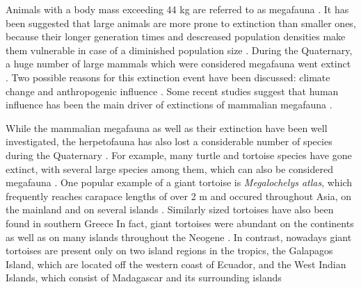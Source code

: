 Animals with a body mass exceeding 44 kg are referred to as megafauna \citep{Barnosky2004, Rhodin2015, Sandom2014}.
It has been suggested that large animals are more prone to extinction than smaller ones, because their longer generation times and descreased population densities make them vulnerable in case of a diminished population size \citep{.}. 
During the Quaternary, a huge number of large mammals which were considered megafauna went extinct \citep{.}.
Two possible reasons for this extinction event have been discussed:
climate change and anthropogenic influence \citep{.}.
Some recent studies suggest that human influence has been the main driver of extinctions of mammalian megafauna \citep{Barnosky2004,Sandom2014,Gibbons2004,Schuster2000}.


While the mammalian megafauna as well as their extinction %
have been well investigated, the herpetofauna has also lost a considerable number of species during the Quaternary \citep{Blain2016}. 
For example, many turtle and tortoise species have gone extinct, with several large species among them, which can also be considered megafauna \citep{Rhodin2015,Froyd2014,Pedrono2013}.
One popular example of a giant tortoise is \textit{Megalochelys atlas}, which frequently reaches carapace lengths of over 2 m and occured throughout Asia, on the mainland and on several islands \citep{.}. Similarly sized tortoises have also been found in southern Greece \citep{.}
In fact, giant tortoises were abundant on the continents as well as on many islands throughout the Neogene \citep{DeLapparentdeBroin2002}. In contrast, nowadays giant tortoises are present only on two island regions in the tropics, the Galapagos Island, which are located off the western coast of Ecuador, and the West Indian Islands, which consist of Madagascar and its surrounding islands \citep{.}





